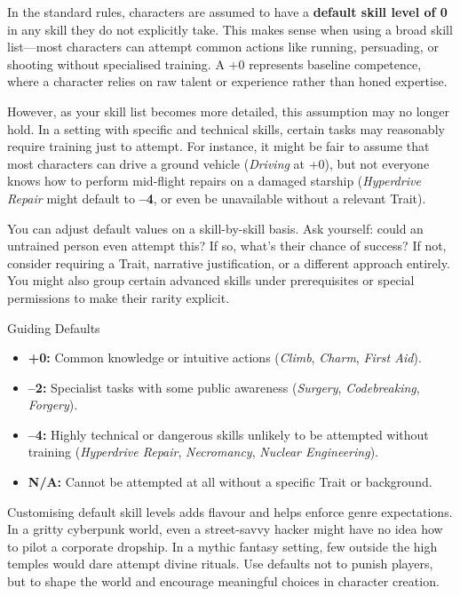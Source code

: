In the standard \wyrd rules, characters are assumed to have a \textbf{default skill level of 0} in any skill they do not explicitly take. This makes sense when using a broad skill list—most characters can attempt common actions like running, persuading, or shooting without specialised training. A +0 represents baseline competence, where a character relies on raw talent or experience rather than honed expertise.

However, as your skill list becomes more detailed, this assumption may no longer hold. In a setting with specific and technical skills, certain tasks may reasonably require training just to attempt. For instance, it might be fair to assume that most characters can drive a ground vehicle (\textit{Driving} at +0), but not everyone knows how to perform mid-flight repairs on a damaged starship (\textit{Hyperdrive Repair} might default to \textbf{–4}, or even be unavailable without a relevant Trait).

You can adjust default values on a skill-by-skill basis. Ask yourself: could an untrained person even attempt this? If so, what’s their chance of success? If not, consider requiring a Trait, narrative justification, or a different approach entirely. You might also group certain advanced skills under prerequisites or special permissions to make their rarity explicit.

\begin{CommentBox}{Guiding Defaults}
    \begin{itemize}
        \item \textbf{+0:} Common knowledge or intuitive actions (\textit{Climb}, \textit{Charm}, \textit{First Aid}).
        \item \textbf{–2:} Specialist tasks with some public awareness (\textit{Surgery}, \textit{Codebreaking}, \textit{Forgery}).
        \item \textbf{–4:} Highly technical or dangerous skills unlikely to be attempted without training (\textit{Hyperdrive Repair}, \textit{Necromancy}, \textit{Nuclear Engineering}).
        \item \textbf{N/A:} Cannot be attempted at all without a specific Trait or background.
    \end{itemize}
\end{CommentBox}

Customising default skill levels adds flavour and helps enforce genre expectations. In a gritty cyberpunk world, even a street-savvy hacker might have no idea how to pilot a corporate dropship. In a mythic fantasy setting, few outside the high temples would dare attempt divine rituals. Use defaults not to punish players, but to shape the world and encourage meaningful choices in character creation.

